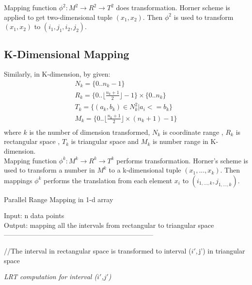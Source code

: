 \documentclass[AMA,LATO1COL]{WileyNJD-v2}
\begin{document}
Mapping function $\phi^2: M^2 \rightarrow R^2 \rightarrow T^2$ does transformation. Horner scheme is applied to get two-dimensional tuple $(x_1,x_2)$. Then $\phi^2$ is used to transform $(x_1,x_2)$ to $(i_1,j_1,i_2,j_2)$.

\subsection{K-Dimensional Mapping}
Similarly, in K-dimension, by given:
\begin{eqnarray}
& N_k = \{0..n_k-1\}          & \\
& R_k = \{0..\lfloor \frac{n_k+1}{2}\rfloor-1\} \times \{0..n_k\}&\\
& T_k = \{(a_k,b_k) \in  N_k^2 | a_i<=b_k\}&\\
& M_k = \{0.. \lfloor \frac{n_k+1}{2}\rfloor \times (n_k+1)-1\}&\\
\end{eqnarray}
where $k$ is the number of dimension transformed, $N_k$ is coordinate range , $R_k$ is rectangular space , $T_k$ is triangular space and $M_k$ is number range in K-dimension.\\

Mapping function $\phi^k: M^k \rightarrow R^k \rightarrow T^k$ performs transformation. Horner's scheme is used to transform a number in $M^k$ to a k-dimensional tuple $(x_1, ...,x_k)$. Then mappings $\phi^k$ performs the translation from each element $x_i$ to $(i_{1,...,k},j_{1,...,k})$.

\begin{algorithm}[t!]
\label{RM}
\caption{ Parallel Range Mapping in 1-d array}\label{RM}
Input:  n data points \\
Output: mapping all the intervals from rectangular to triangular space\\
------------------------------------------------------------------ \\
\begin{algorithmic}[1]
\State //The interval  in rectangular space is transformed to interval ($i',$j') in triangular space
\Else
{}

\EndIf
\EndIf
\State \textit {LRT computation for interval (${i\prime}$,${j\prime}$)}
\EndFor
\EndFor
\end{algorithmic}
\end{algorithm}
\end{document}

